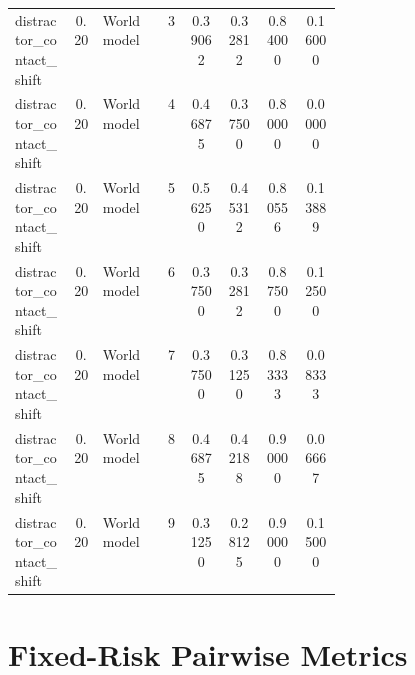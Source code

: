 \documentclass{article}
\begin{document}
\begin{center}
\begin{longtable}{p{0.18\linewidth}cp{0.20\linewidth}ccccc}
distractor\_contact\_shift & 0.20 & World model & 3 & 0.39062 & 0.32812 & 0.84000 & 0.16000\\
distractor\_contact\_shift & 0.20 & World model & 4 & 0.46875 & 0.37500 & 0.80000 & 0.00000\\
distractor\_contact\_shift & 0.20 & World model & 5 & 0.56250 & 0.45312 & 0.80556 & 0.13889\\
distractor\_contact\_shift & 0.20 & World model & 6 & 0.37500 & 0.32812 & 0.87500 & 0.12500\\
distractor\_contact\_shift & 0.20 & World model & 7 & 0.37500 & 0.31250 & 0.83333 & 0.08333\\
distractor\_contact\_shift & 0.20 & World model & 8 & 0.46875 & 0.42188 & 0.90000 & 0.06667\\
distractor\_contact\_shift & 0.20 & World model & 9 & 0.31250 & 0.28125 & 0.90000 & 0.15000\\
\bottomrule
\end{longtable}
\normalsize
\end{center}

\section{Fixed-Risk Pairwise Metrics}
\end{document}
